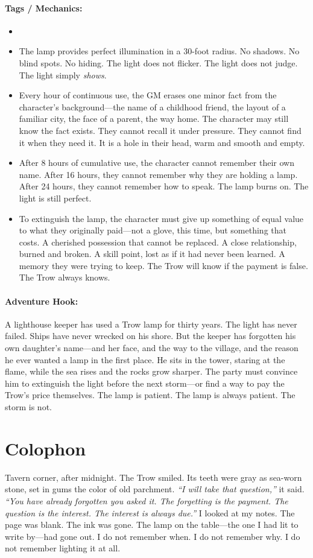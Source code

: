 \paragraph{Tags / Mechanics:}
\begin{itemize}
\item [LIGHT] [CURSE] [SILENCE] [SECRET]
\item The lamp provides perfect illumination in a 30-foot radius. No shadows. No blind spots. No hiding. The light does not flicker. The light does not judge. The light simply \textit{shows}.
\item Every hour of continuous use, the GM erases one minor fact from the character's background---the name of a childhood friend, the layout of a familiar city, the face of a parent, the way home. The character may still know the fact exists. They cannot recall it under pressure. They cannot find it when they need it. It is a hole in their head, warm and smooth and empty.
\item After 8 hours of cumulative use, the character cannot remember their own name. After 16 hours, they cannot remember why they are holding a lamp. After 24 hours, they cannot remember how to speak. The lamp burns on. The light is still perfect.
\item To extinguish the lamp, the character must give up something of equal value to what they originally paid---not a glove, this time, but something that costs. A cherished possession that cannot be replaced. A close relationship, burned and broken. A skill point, lost as if it had never been learned. A memory they were trying to keep. The Trow will know if the payment is false. The Trow always knows.
\end{itemize}

\paragraph{Adventure Hook:}
A lighthouse keeper has used a Trow lamp for thirty years. The light has never failed. Ships have never wrecked on his shore. But the keeper has forgotten his own daughter's name---and her face, and the way to the village, and the reason he ever wanted a lamp in the first place. He sits in the tower, staring at the flame, while the sea rises and the rocks grow sharper. The party must convince him to extinguish the light before the next storm---or find a way to pay the Trow's price themselves. The lamp is patient. The lamp is always patient. The storm is not.

\section*{Colophon}
Tavern corner, after midnight. The Trow smiled. Its teeth were gray as sea-worn stone, set in gums the color of old parchment. \textit{``I will take that question,''} it said. \textit{``You have already forgotten you asked it. The forgetting is the payment. The question is the interest. The interest is always due.''} I looked at my notes. The page was blank. The ink was gone. The lamp on the table---the one I had lit to write by---had gone out. I do not remember when. I do not remember why. I do not remember lighting it at all.